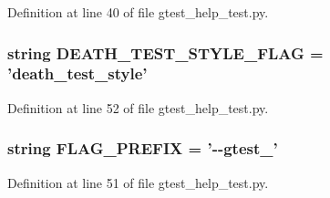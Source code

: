 \-Definition at line 40 of file gtest\-\_\-help\-\_\-test.\-py.

\hypertarget{namespacegtest__help__test_a9ffc22a95a6095c01fa05852fcbe4e1a}{
\subsubsection[{\-D\-E\-A\-T\-H\-\_\-\-T\-E\-S\-T\-\_\-\-S\-T\-Y\-L\-E\-\_\-\-F\-L\-A\-G}]{\setlength{\rightskip}{0pt plus 5cm}string {\bf \-D\-E\-A\-T\-H\-\_\-\-T\-E\-S\-T\-\_\-\-S\-T\-Y\-L\-E\-\_\-\-F\-L\-A\-G} = 'death\-\_\-test\-\_\-style'}}\label{de/dbf/namespacegtest__help__test_a9ffc22a95a6095c01fa05852fcbe4e1a}


\-Definition at line 52 of file gtest\-\_\-help\-\_\-test.\-py.

\hypertarget{namespacegtest__help__test_a039a9c55dc7e4ad6e844e99fcb46d665}{
\subsubsection[{\-F\-L\-A\-G\-\_\-\-P\-R\-E\-F\-I\-X}]{\setlength{\rightskip}{0pt plus 5cm}string {\bf \-F\-L\-A\-G\-\_\-\-P\-R\-E\-F\-I\-X} = '-\/-\/gtest\-\_\-'}}\label{de/dbf/namespacegtest__help__test_a039a9c55dc7e4ad6e844e99fcb46d665}


\-Definition at line 51 of file gtest\-\_\-help\-\_\-test.\-py.

